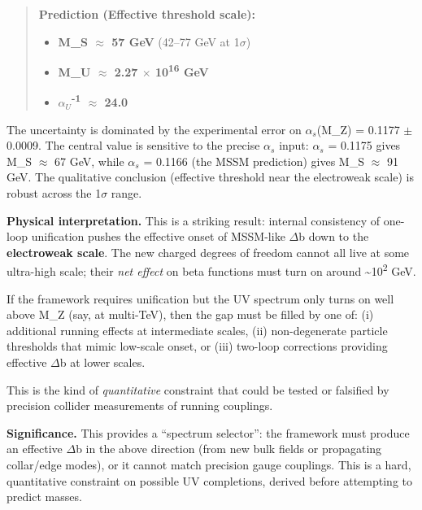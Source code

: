 \documentclass[11pt,a4paper]{article}
\theoremstyle{remark}
\providecommand{\tightlist}{%
  \setlength{\itemsep}{0pt}\setlength{\parskip}{0pt}}
\begin{document}
\begin{quote}
\textbf{Prediction (Effective threshold scale):}

\begin{itemize}
\tightlist
\item
  \textbf{M\_S \ensuremath{\approx} 57 GeV} (42--77 GeV at 1\ensuremath{\sigma})
\item
  \textbf{M\_U \ensuremath{\approx} 2.27 \ensuremath{\times} 10\textsuperscript{16} GeV}
\item
  \textbf{\(\alpha_U\)\textsuperscript{-1} \ensuremath{\approx} 24.0}
\end{itemize}
\end{quote}

The uncertainty is dominated by the experimental error on \(\alpha_s\)(M\_Z) = 0.1177 \ensuremath{\pm} 0.0009.
The central value is sensitive to the precise \(\alpha_s\) input: \(\alpha_s\) = 0.1175 gives
M\_S \ensuremath{\approx} 67 GeV, while \(\alpha_s\) = 0.1166 (the MSSM prediction) gives M\_S \ensuremath{\approx} 91 GeV.
The qualitative conclusion (effective threshold near the electroweak scale)
is robust across the 1\ensuremath{\sigma} range.

\textbf{Physical interpretation.} This is a striking result: internal consistency of
one-loop unification pushes the effective onset of MSSM-like \ensuremath{\Delta}b down to the
\textbf{electroweak scale}. The new charged degrees of freedom cannot all live at
some ultra-high scale; their \emph{net effect} on beta functions must turn on around
\textasciitilde10\textsuperscript{2} GeV.

If the framework requires unification but the UV spectrum only turns on well
above M\_Z (say, at multi-TeV), then the gap must be filled by one of:
(i) additional running effects at intermediate scales,
(ii) non-degenerate particle thresholds that mimic low-scale onset, or
(iii) two-loop corrections providing effective \ensuremath{\Delta}b at lower scales.

This is the kind of \emph{quantitative} constraint that could be tested or falsified
by precision collider measurements of running couplings.

\textbf{Significance.} This provides a ``spectrum selector'': the framework must
produce an effective \ensuremath{\Delta}b in the above direction (from new bulk fields or
propagating collar/edge modes), or it cannot match precision gauge couplings.
This is a hard, quantitative constraint on possible UV completions, derived
before attempting to predict masses.
\end{document}
